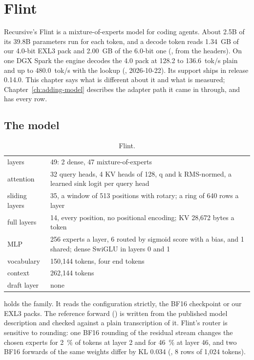 \chapter{Flint}\label{ch:flint}

Recursive's Flint is a mixture-of-experts model for coding agents. About 2.5B of its 39.8B parameters run for each token, and a decode token reads 1.34~GB of our 4.0-bit EXL3 pack and 2.00~GB of the 6.0-bit one (\arith, from the headers). On one DGX Spark the engine decodes the 4.0 pack at 128.2 to 136.6~tok/s plain and up to 480.0~tok/s with the lookup (\measured, 2026-10-22). Its support ships in release 0.14.0. This chapter says what is different about it and what is measured; Chapter~\ref{ch:adding-model} describes the adapter path it came in through, and  has every row.

\section{The model}

\begin{table}[htbp]
\centering\small
\caption{Flint.}\label{tab:flint-model}
\begin{tabularx}{\linewidth}{@{}L{.22\linewidth}Y@{}}
\toprule
{} &  \\
\midrule
layers & 49: 2 dense, 47 mixture-of-experts \\
attention & 32 query heads, 4 KV heads of 128, q and k RMS-normed, a learned sink logit per query head \\
sliding layers & 35, a window of 513 positions with rotary; a ring of 640 rows a layer \\
full layers & 14, every position, no positional encoding; KV 28,672 bytes a token \\
MLP & 256 experts a layer, 6 routed by sigmoid score with a bias, and 1 shared; dense SwiGLU in layers 0 and 1 \\
vocabulary & 150,144 tokens, four end tokens \\
context & 262,144 tokens \\
draft layer & none \\
\bottomrule
\end{tabularx}
\end{table}

 holds the family. It reads the configuration strictly, the BF16 checkpoint or our EXL3 packs. The reference forward () is written from the published model description and checked against a plain transcription of it. Flint's router is sensitive to rounding: one BF16 rounding of the residual stream changes the chosen experts for 2~\% of tokens at layer 2 and for 46~\% at layer 46, and two BF16 forwards of the same weights differ by KL 0.034 (\measured, 8 rows of 1,024 tokens).

